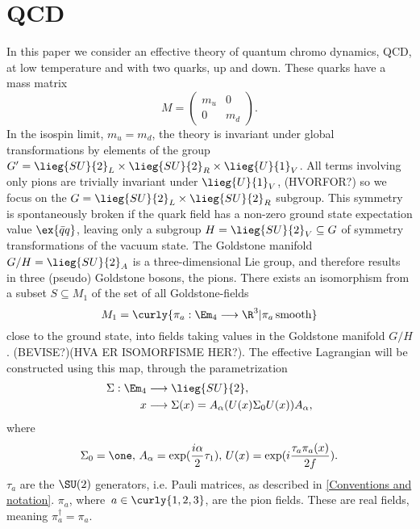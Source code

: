 \section{QCD}

In this paper we consider an effective theory of quantum chromo dynamics, QCD, at low temperature and with two quarks, up and down.
These quarks have a mass matrix 
\begin{equation}
    \label{Mass matrix}
    M =
    \begin{pmatrix}
        m_u & 0 \\
        0 & m_d
    \end{pmatrix}.
\end{equation}
In the isospin limit, $m_u = m_d$, the theory is invariant under global transformations by elements of the group $G' = \lieg{SU}{2}_L \times \lieg{SU}{2}_R \times \lieg{U}{1}_V$.
All terms involving only pions are trivially invariant under $\lieg{U}{1}_V$, (HVORFOR?) so we focus on the $G = \lieg{SU}{2}_L \times \lieg{SU}{2}_R$ subgroup.
This symmetry is spontaneously broken if the quark field has a non-zero ground state expectation value $\ex{\bar q q}$, leaving only a subgroup $H = \lieg{SU}{2}_V \subseteq G$ of symmetry transformations of the vacuum state.
The Goldstone manifold $G/H = \lieg{SU}{2}_A$ is a three-dimensional Lie group, and therefore results in three (pseudo) Goldstone bosons, the pions.
There exists an isomorphism from a subset $S \subseteq M_1$ of the set of all Goldstone-fields
\begin{equation*}
    M_1 = \curly{ \pi_a: \Em_4 \longrightarrow \R^3 | \pi_a \, \mathrm{smooth} }
\end{equation*}
close to the ground state, into fields taking values in the Goldstone manifold $G/H$. (BEVISE?)(HVA ER ISOMORFISME HER?).
The \chpt effective Lagrangian will be constructed using this map, through the parametrization
\begin{align}
\label{sigma}
    \Sigma : \Em_4 & \longrightarrow \lieg{SU}{2},\\ \notag
    x & \longrightarrow \Sigma(x) = A_\alpha (U(x) \Sigma_0 U(x)) A_\alpha,
\end{align}
where
\begin{align*}
    \Sigma_0 = \one,\, 
    A_\alpha = \exp(\frac{i \alpha}{2} \tau_1),\, 
    U(x) = \exp(i \frac{\tau_a\pi_a(x)}{2f}).
\end{align*}
$\tau_a$ are the $\SU(2)$ generators, i.e. Pauli matrices, as described in \autoref{Conventions and notation}.
$\pi_a$, where $ \, a \in \curly{1, 2, 3}$, are the pion fields. These are real fields, meaning $\pi_a^\dagger = \pi_a$.
